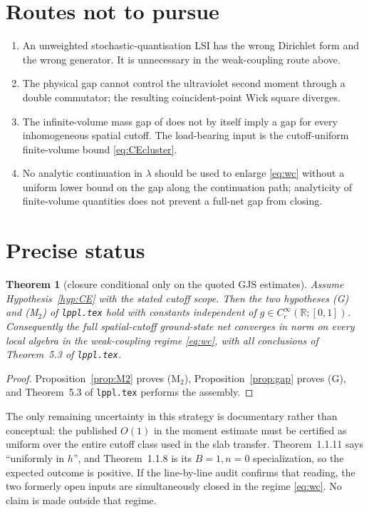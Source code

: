 \documentclass[11pt,a4paper]{article}
\newtheorem{theorem}{Theorem}[section]
\theoremstyle{remark}
\newcommand{\R}{\mathbb R}
\begin{document}
\section{Routes not to pursue}

\begin{enumerate}
\item An unweighted stochastic-quantisation LSI has the wrong Dirichlet form and the wrong
generator.  It is unnecessary in the weak-coupling route above.
\item The physical gap cannot control the ultraviolet second moment through a double commutator;
the resulting coincident-point Wick square diverges.
\item The infinite-volume mass gap of \cite[Thm.~1.1.2]{GJS} does not by itself imply a gap for
every inhomogeneous spatial cutoff.  The load-bearing input is the cutoff-uniform finite-volume
bound \eqref{eq:CEcluster}.
\item No analytic continuation in $\lambda$ should be used to enlarge \eqref{eq:wc} without a
uniform lower bound on the gap along the continuation path; analyticity of finite-volume
quantities does not prevent a full-net gap from closing.
\end{enumerate}

\section{Precise status}

\begin{theorem}[closure conditional only on the quoted GJS estimates]\label{thm:status}
Assume Hypothesis~\ref{hyp:CE} with the stated cutoff scope.  Then the two hypotheses (G) and
(M$_2$) of \texttt{lppl.tex} hold with constants independent of
$g\in C_c^\infty(\R;[0,1])$.  Consequently the full spatial-cutoff ground-state net converges in
norm on every local algebra in the weak-coupling regime \eqref{eq:wc}, with all conclusions of
Theorem~5.3 of \texttt{lppl.tex}.
\end{theorem}

\begin{proof}
Proposition~\ref{prop:M2} proves (M$_2$), Proposition~\ref{prop:gap} proves (G), and
Theorem~5.3 of \texttt{lppl.tex} performs the assembly.
\end{proof}

The only remaining uncertainty in this strategy is documentary rather than conceptual: the
published $O(1)$ in the moment estimate must be certified as uniform over the entire cutoff class
used in the slab transfer.  Theorem~1.1.11 says ``uniformly in $h$'', and Theorem~1.1.8 is its
$B=1,n=0$ specialization, so the expected outcome is positive.  If the line-by-line audit confirms
that reading, the two formerly open inputs are simultaneously closed in the regime
\eqref{eq:wc}.  No claim is made outside that regime.
\end{document}
